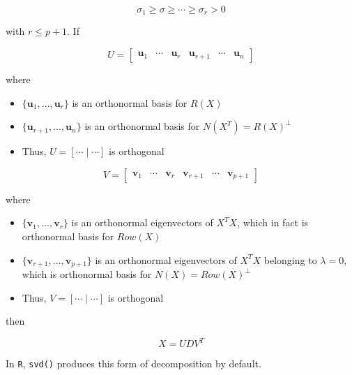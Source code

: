 \documentclass[]{book}
\theoremstyle{definition}
\theoremstyle{definition}
\theoremstyle{definition}
\theoremstyle{remark}
\begin{document}
\[\sigma_1 \ge \sigma \ge \cdots \ge \sigma_r > 0\]

with \(r \le p + 1\). If

\[
U = \left[\begin{array}{ccc|ccc}
  \mathbf{u}_1 & \cdots & \mathbf{u}_r & \mathbf{u}_{r + 1} & \cdots & \mathbf{u}_n
\end{array}\right]
\]

where

\begin{itemize}
  \item $\{ \mathbf{u}_1, \ldots, \mathbf{u}_r \}$ is an orthonormal basis for $R(X)$
  \item $\{ \mathbf{u}_{r + 1}, \ldots, \mathbf{u}_n \}$ is an orthonormal basis for $N(X^T) = R(X)^{\perp}$
  \item Thus, $U = [ \cdots \mid \cdots ]$ is orthogonal
\end{itemize}

\[
V = \left[\begin{array}{ccc|ccc}
  \mathbf{v}_1 & \cdots & \mathbf{v}_r & \mathbf{v}_{r + 1} & \cdots & \mathbf{v}_{p + 1}
\end{array}\right]
\]

where

\begin{itemize}
  \item $\{ \mathbf{v}_1, \ldots, \mathbf{v}_r \}$ is an orthonormal eigenvectors of $X^T X$, which in fact is orthonormal basis for $Row(X)$
  \item $\{ \mathbf{v}_{r + 1}, \ldots, \mathbf{v}_{p + 1} \}$ is an orthonormal eigenvectors of $X^T X$ belonging to $\lambda = 0$, which is orthonormal basis for $N(X) = Row(X)^{\perp}$
  \item Thus, $V = [ \cdots \mid \cdots ]$ is orthogonal
\end{itemize}

then

\[X = UDV^T\]

In \texttt{R}, \texttt{svd()} produces this form of decomposition by default.
\end{document}
